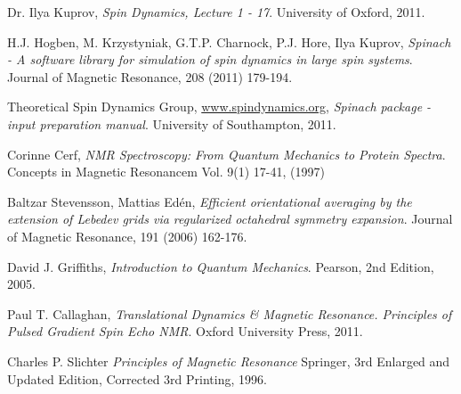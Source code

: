 \documentclass[11.5pt,a4paper]{article}
\begin{document}
\FloatBarrier
\begin{thebibliography}{9}
  Dr. Ilya Kuprov,
  \emph{Spin Dynamics, Lecture 1 - 17}.
  University of Oxford,
  2011.

  H.J. Hogben, M. Krzystyniak, G.T.P. Charnock, P.J. Hore, Ilya Kuprov,
  \emph{Spinach - A software library for simulation of spin dynamics in large spin systems}.
  Journal of Magnetic Resonance,
  208 (2011) 179-194.

  Theoretical Spin Dynamics Group, \url{www.spindynamics.org}, 
  \emph{Spinach package - input preparation manual}.
  University of Southampton, 
  2011.

  Corinne Cerf,
  \emph{NMR Spectroscopy: From Quantum Mechanics to Protein Spectra}.
  Concepts in Magnetic Resonancem Vol. 9(1) 17-41, (1997)

  Baltzar Stevensson, Mattias Ed\'en,
  \emph{Efficient orientational averaging by the extension of Lebedev grids via regularized octahedral symmetry expansion}.
  Journal of Magnetic Resonance,
  191 (2006) 162-176.

  David J. Griffiths,
  \emph{Introduction to Quantum Mechanics}.
  Pearson, 
  2nd Edition, 
  2005.

  Paul T. Callaghan,
  \emph{Translational Dynamics \& Magnetic Resonance. Principles of Pulsed Gradient Spin Echo NMR}.
  Oxford University Press,
  2011.

  Charles P. Slichter
  \emph{Principles of Magnetic Resonance}
  Springer,
  3rd Enlarged and Updated Edition, Corrected 3rd Printing,
  1996.

\end{thebibliography}
\end{document}
